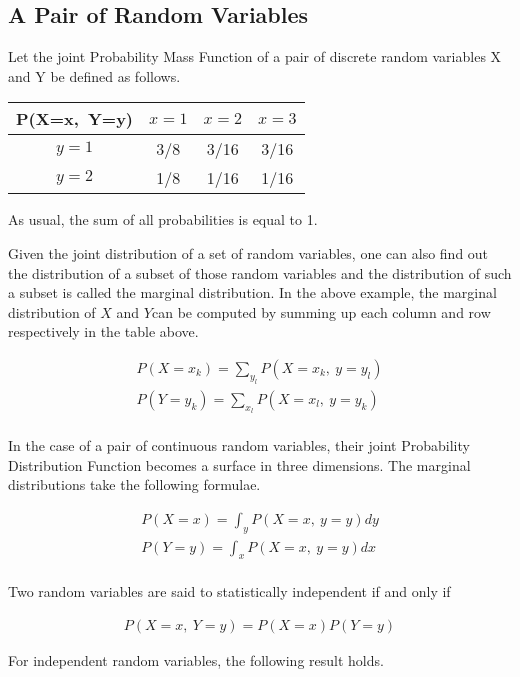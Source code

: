 \documentclass[11pt, a4paper]{article}
\begin{document}
\subsection{A Pair of Random Variables}

Let the joint Probability Mass Function of a pair of discrete random variables X  and Y be defined as follows.

\begin{table}[htbp]
	\centering
	\begin{tabular}{|c|c|c|c|}
		\toprule
		P(X=x,\ Y=y) & $x=1$ & $x=2$ & $x=3$ \\
		\midrule
		$y=1$        & 3/8   & 3/16  & 3/16  \\
		$y=2$        & 1/8   & 1/16  & 1/16  \\
		\hline
	\end{tabular}
\end{table}

As usual, the sum of all probabilities is equal to 1. 

Given the joint distribution of a set of random variables, one can also find out the distribution of a subset of those random variables and the distribution of such a subset is called the marginal distribution. In the above example, the marginal distribution of $X$ and $Y$can be computed by summing up each column and row respectively in the table above.

\begin{align*}
	P(X=x_k) = \sum_{y_l} P(X=x_k,\ y=y_l) \\
	P(Y=y_k) = \sum_{x_l} P(X=x_l,\ y=y_k) \\	
\end{align*}

In the case of a pair of continuous random variables, their joint Probability Distribution Function becomes a surface in three dimensions. The marginal distributions take the following formulae.

\begin{align*}
	P(X=x) = \int_y P(X=x,\ y=y)dy \\
	P(Y=y) = \int_x P(X=x,\ y=y)dx \\
\end{align*}

Two random variables are said to statistically independent if and only if

\begin{align*}
	P(X=x,\ Y=y) = P(X=x)P(Y=y) 
\end{align*}

For independent random variables, the following result holds.
\end{document}
